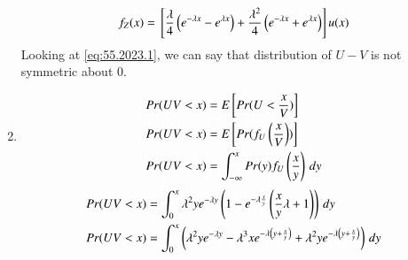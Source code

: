 \documentclass[journal,12pt,twocolumn]{IEEEtran}
\theoremstyle{remark}
\begin{document}
\begin{enumerate}
\begin{align}
f_Z(x) = {}\left[\frac{\lambda}{4}\left(e^{-\lambda x}-e^{\lambda x}\right) + \frac{\lambda^2}{4}\left(e^{-\lambda x}+e^{\lambda x}\right)\right]u(x) \label{eq:55.2023.1}
\end{align}
Looking at \eqref{eq:55.2023.1}, we can say that distribution of $U-V$ is not symmetric about 0.
\item 
\begin{align}
Pr(UV<x) &= E{}\left[Pr(U<\frac{x}{V})\right]\\
Pr(UV<x) &= E{}\left[Pr(f_{U}\left(\frac{x}{V}\right))\right]\\
Pr(UV<x) &= \int_{-\infty}^{x} Pr(y)f_{U}\left(\frac{x}{y}\right) \, dy\\
\end{align}
\begin{align}
Pr(UV<x) &= \int_{0}^{x} \lambda^{2}ye^{-\lambda y} \left(1 - e^{-\lambda \frac{x}{y}}\left(\frac{x}{y}\lambda  + 1\right)\right)  \, dy\\
Pr(UV<x) &= \int_{0}^{x} \left(\lambda^{2}ye^{-\lambda y} - \lambda^{3}xe^{-\lambda\left( y + \frac{x}{y}\right)} + \lambda^{2}ye^{-\lambda\left( y + \frac{x}{y}\right)} \right)\, dy\\
\end{align}
\end{enumerate}
\end{document}
